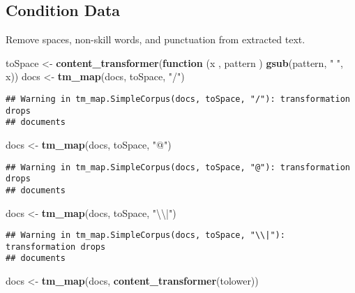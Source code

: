 \documentclass[]{article}
\newenvironment{Shaded}{\begin{snugshade}}{\end{snugshade}}
\newcommand{\CharTok}[1]{\textcolor[rgb]{0.31,0.60,0.02}{#1}}
\newcommand{\ControlFlowTok}[1]{\textcolor[rgb]{0.13,0.29,0.53}{\textbf{#1}}}
\newcommand{\KeywordTok}[1]{\textcolor[rgb]{0.13,0.29,0.53}{\textbf{#1}}}
\newcommand{\NormalTok}[1]{#1}
\newcommand{\StringTok}[1]{\textcolor[rgb]{0.31,0.60,0.02}{#1}}
\begin{document}
\hypertarget{condition-data}{%
\subsection{Condition Data}\label{condition-data}}

Remove spaces, non-skill words, and punctuation from extracted text.

\begin{Shaded}
\begin{Highlighting}[]
\NormalTok{toSpace <-}\StringTok{ }\KeywordTok{content_transformer}\NormalTok{(}\ControlFlowTok{function}\NormalTok{ (x , pattern ) }\KeywordTok{gsub}\NormalTok{(pattern, }\StringTok{" "}\NormalTok{, x))}
\NormalTok{docs <-}\StringTok{ }\KeywordTok{tm_map}\NormalTok{(docs, toSpace, }\StringTok{"/"}\NormalTok{)}
\end{Highlighting}
\end{Shaded}

\begin{verbatim}
## Warning in tm_map.SimpleCorpus(docs, toSpace, "/"): transformation drops
## documents
\end{verbatim}

\begin{Shaded}
\begin{Highlighting}[]
\NormalTok{docs <-}\StringTok{ }\KeywordTok{tm_map}\NormalTok{(docs, toSpace, }\StringTok{"@"}\NormalTok{)}
\end{Highlighting}
\end{Shaded}

\begin{verbatim}
## Warning in tm_map.SimpleCorpus(docs, toSpace, "@"): transformation drops
## documents
\end{verbatim}

\begin{Shaded}
\begin{Highlighting}[]
\NormalTok{docs <-}\StringTok{ }\KeywordTok{tm_map}\NormalTok{(docs, toSpace, }\StringTok{"}\CharTok{\textbackslash{}\textbackslash{}}\StringTok{|"}\NormalTok{)}
\end{Highlighting}
\end{Shaded}

\begin{verbatim}
## Warning in tm_map.SimpleCorpus(docs, toSpace, "\\|"): transformation drops
## documents
\end{verbatim}

\begin{Shaded}
\begin{Highlighting}[]
\NormalTok{docs <-}\StringTok{ }\KeywordTok{tm_map}\NormalTok{(docs, }\KeywordTok{content_transformer}\NormalTok{(tolower))}
\end{Highlighting}
\end{Shaded}
\end{document}
